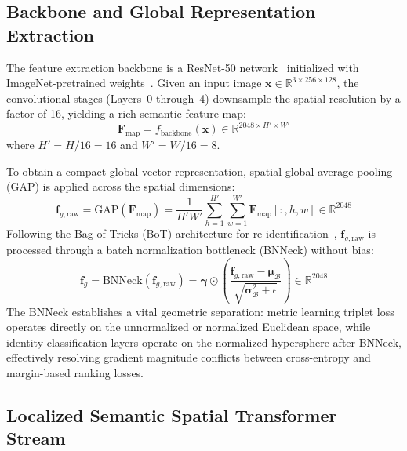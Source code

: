 \subsection{Backbone and Global Representation Extraction}

The feature extraction backbone is a ResNet-50 network~\cite{he2016deep} initialized with ImageNet-pretrained weights~\cite{deng2009imagenet}. Given an input image $\mathbf{x} \in \mathbb{R}^{3 \times 256 \times 128}$, the convolutional stages (Layers~0 through~4) downsample the spatial resolution by a factor of 16, yielding a rich semantic feature map:
\begin{equation}
    \mathbf{F}_{\text{map}} = f_{\text{backbone}}(\mathbf{x}) \in \mathbb{R}^{2048 \times H' \times W'}
\end{equation}
where $H' = H / 16 = 16$ and $W' = W / 16 = 8$.

To obtain a compact global vector representation, spatial global average pooling (GAP) is applied across the spatial dimensions:
\begin{equation}
    \mathbf{f}_{g, \text{raw}} = \text{GAP}(\mathbf{F}_{\text{map}}) = \frac{1}{H' W'} \sum_{h=1}^{H'} \sum_{w=1}^{W'} \mathbf{F}_{\text{map}}[:, h, w] \in \mathbb{R}^{2048}
\end{equation}
Following the Bag-of-Tricks (BoT) architecture for re-identification~\cite{lin2019bot}, $\mathbf{f}_{g, \text{raw}}$ is processed through a batch normalization bottleneck (BNNeck) without bias:
\begin{equation}
    \mathbf{f}_g = \text{BNNeck}(\mathbf{f}_{g, \text{raw}}) = \boldsymbol{\gamma} \odot \left( \frac{\mathbf{f}_{g, \text{raw}} - \boldsymbol{\mu}_{\mathcal{B}}}{\sqrt{\boldsymbol{\sigma}_{\mathcal{B}}^2 + \epsilon}} \right) \in \mathbb{R}^{2048}
\end{equation}
The BNNeck establishes a vital geometric separation: metric learning triplet loss operates directly on the unnormalized or normalized Euclidean space, while identity classification layers operate on the normalized hypersphere after BNNeck, effectively resolving gradient magnitude conflicts between cross-entropy and margin-based ranking losses.

\subsection{Localized Semantic Spatial Transformer Stream}


